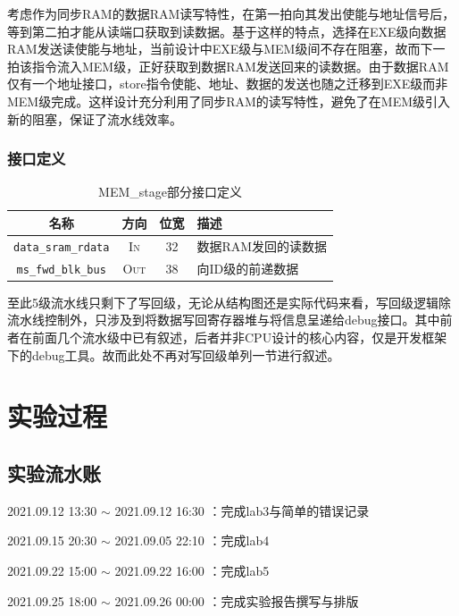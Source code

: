 \documentclass[UTF-8,twoside,c5size]{ctexart}
\begin{document}
	考虑作为同步RAM的数据RAM读写特性，在第一拍向其发出使能与地址信号后，等到第二拍才能从读端口获取到读数据。基于这样的特点，选择在EXE级向数据RAM发送读使能与地址，当前设计中EXE级与MEM级间不存在阻塞，故而下一拍该指令流入MEM级，正好获取到数据RAM发送回来的读数据。由于数据RAM仅有一个地址接口，store指令使能、地址、数据的发送也随之迁移到EXE级而非MEM级完成。这样设计充分利用了同步RAM的读写特性，避免了在MEM级引入新的阻塞，保证了流水线效率。
		
	\subsubsection{接口定义}
	
	\begin{table}[!h]
		\centering
		\caption{MEM\_stage部分接口定义}
		\begin{tabularx}{\textwidth}{|c|c|c|Y|}
			\hline
			\textbf{名称} & \textbf{方向} & \textbf{位宽} & \textbf{描述} \\
			\hline
			\texttt{data\_sram\_rdata} & \textsc{In} & 32 & 数据RAM发回的读数据 \\
			\hline
			\texttt{ms\_fwd\_blk\_bus} & \textsc{Out} & 38 & 向ID级的前递数据 \\
			\hline
		\end{tabularx}
	\end{table}

\hfill

	至此5级流水线只剩下了写回级，无论从结构图还是实际代码来看，写回级逻辑除流水线控制外，只涉及到将数据写回寄存器堆与将信息呈递给debug接口。其中前者在前面几个流水级中已有叙述，后者并非CPU设计的核心内容，仅是开发框架下的debug工具。故而此处不再对写回级单列一节进行叙述。
	
\newpage
	
	\section{实验过程}
	
	\subsection{实验流水账}
	2021.09.12 13:30 $ \sim $ 2021.09.12 16:30 ：完成lab3与简单的错误记录
	
	2021.09.15 20:30 $ \sim $ 2021.09.05 22:10 ：完成lab4
	
	2021.09.22 15:00 $ \sim $ 2021.09.22 16:00 ：完成lab5
	
	2021.09.25 18:00 $ \sim $ 2021.09.26 00:00 ：完成实验报告撰写与排版
	
\end{document}
